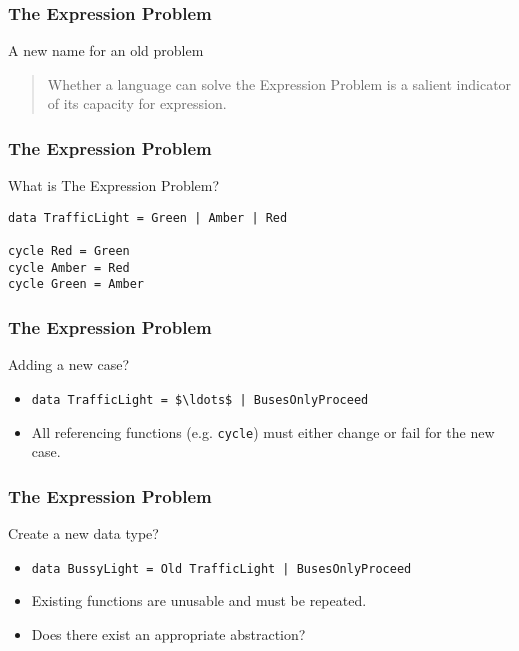 \begin{frame}
\frametitle{The Expression Problem}
\begin{block}{A new name for an old problem\cite{wadler1998expression}}
\begin{quote}
Whether a language can solve the Expression Problem is a salient
indicator of its capacity for expression.
\end{quote}
\end{block}
\end{frame}

\begin{frame}[fragile]
\frametitle{The Expression Problem}
\begin{block}{What is The Expression Problem?}
\begin{lstlisting}[style=haskell,mathescape]
data TrafficLight = Green | Amber | Red

cycle Red = Green
cycle Amber = Red
cycle Green = Amber
\end{lstlisting}
\end{block}
\end{frame}

\begin{frame}[fragile]
\frametitle{The Expression Problem}
\begin{block}{Adding a new case?}
\begin{itemize}
\item<1-> \lstinline[style=haskell,mathescape]{data TrafficLight = $\ldots$ | BusesOnlyProceed}
\item<2-> All referencing functions (e.g. \lstinline[style=haskell]{cycle}) must either change or fail for the new case.
\end{itemize}
\end{block}
\end{frame}

\begin{frame}[fragile]
\frametitle{The Expression Problem}
\begin{block}{Create a new data type?}
\begin{itemize}
\item<1-> \lstinline[style=haskell,mathescape]{data BussyLight = Old TrafficLight | BusesOnlyProceed}
\item<2-> Existing functions are unusable and must be repeated.
\item<3-> Does there exist an appropriate abstraction? 
\end{itemize}
\end{block}
\end{frame}
